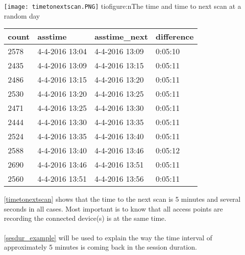 \begin{table}[H]
	\centering
	\texttt{[image: timetonextscan.PNG]}
 tiofigure:n{The time and time to next scan at a random day}
	\label{timetonextscan}
	\begin{tabular}{@{}llll@{}}
		\toprule
		count & asstime        & asstime\_next  & difference \\ \midrule
		2578  & 4-4-2016 13:04 & 4-4-2016 13:09 & 0:05:10    \\
		2435  & 4-4-2016 13:09 & 4-4-2016 13:15 & 0:05:11    \\
		2486  & 4-4-2016 13:15 & 4-4-2016 13:20 & 0:05:11    \\
		2530  & 4-4-2016 13:20 & 4-4-2016 13:25 & 0:05:11    \\
		2471  & 4-4-2016 13:25 & 4-4-2016 13:30 & 0:05:11    \\
		2444  & 4-4-2016 13:30 & 4-4-2016 13:35 & 0:05:11    \\
		2524  & 4-4-2016 13:35 & 4-4-2016 13:40 & 0:05:11    \\
		2588  & 4-4-2016 13:40 & 4-4-2016 13:46 & 0:05:12    \\
		2690  & 4-4-2016 13:46 & 4-4-2016 13:51 & 0:05:11    \\
		2560  & 4-4-2016 13:51 & 4-4-2016 13:56 & 0:05:11    \\ \bottomrule
	\end{tabular}
\end{table}

         
\autoref{timetonextscan} shows that the time to the next scan is 5 minutes and several seconds in all cases. Most important is to know that all access points are recording the connected device(s) is at the same time. 
\\\\                                                        
\autoref{sesdur_example} will be used to explain the way the time interval of approximately 5 minutes is coming back in the session duration.
                                                                       
